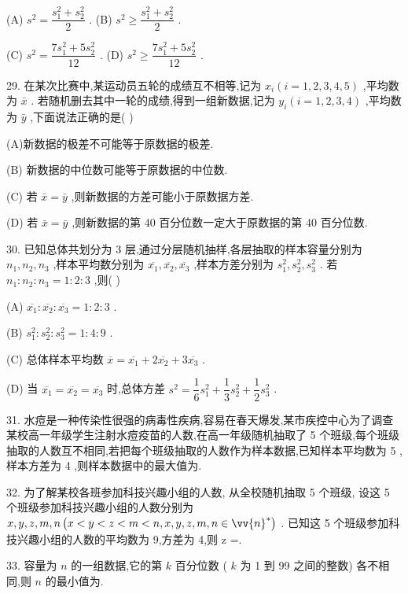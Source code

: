(A) ${s}^{2} = \dfrac{{s}_{1}^{2} + {s}_{2}^{2}}{2}$ . (B) ${s}^{2} \geq  \dfrac{{s}_{1}^{2} + {s}_{2}^{2}}{2}$ .

(C) ${s}^{2} = \dfrac{7{s}_{1}^{2} + 5{s}_{2}^{2}}{12}$ . (D) ${s}^{2} \geq  \dfrac{7{s}_{1}^{2} + 5{s}_{2}^{2}}{12}$ .

29. 在某次比赛中,某运动员五轮的成绩互不相等,记为 ${x}_{i}\left( {i = 1,2,3,4,5}\right)$ ,平均数为 $\bar{x}$ . 若随机删去其中一轮的成绩,得到一组新数据,记为 ${y}_{i}\left( {i = 1,2,3,4}\right)$ ,平均数为 $\bar{y}$ ,下面说法正确的是(   )

(A)新数据的极差不可能等于原数据的极差.

(B) 新数据的中位数可能等于原数据的中位数.

(C) 若 $\bar{x} = \bar{y}$ ,则新数据的方差可能小于原数据方差.

(D) 若 $\bar{x} = \bar{y}$ ,则新数据的第 40 百分位数一定大于原数据的第 40 百分位数.

30. 已知总体共划分为 3 层,通过分层随机抽样,各层抽取的样本容量分别为 ${n}_{1},{n}_{2},{n}_{3}$ ,样本平均数分别为 $\overline{{x}_{1}},\overline{{x}_{2}},\overline{{x}_{3}}$ ,样本方差分别为 ${s}_{1}^{2},{s}_{2}^{2},{s}_{3}^{2}$ . 若 ${n}_{1} : {n}_{2} : {n}_{3} = 1 : 2 : 3$ ,则(   )

(A) $\overline{{x}_{1}} : \overline{{x}_{2}} : \overline{{x}_{3}} = 1 : 2 : 3$ .

(B) ${s}_{1}^{2} : {s}_{2}^{2} : {s}_{3}^{2} = 1 : 4 : 9$ .

(C) 总体样本平均数 $\overline{x} = \overline{{x}_{1}} + 2\overline{{x}_{2}} + 3\overline{{x}_{3}}$ .

(D) 当 $\overline{{x}_{1}} = \overline{{x}_{2}} = \overline{{x}_{3}}$ 时,总体方差 ${s}^{2} = \dfrac{1}{6}{s}_{1}^{2} + \dfrac{1}{3}{s}_{2}^{2} + \dfrac{1}{2}{s}_{3}^{2}$ .

31. 水痘是一种传染性很强的病毒性疾病,容易在春天爆发,某市疾控中心为了调查某校高一年级学生注射水痘疫苗的人数,在高一年级随机抽取了 5 个班级,每个班级抽取的人数互不相同,若把每个班级抽取的人数作为样本数据,已知样本平均数为 5 ,样本方差为 4 ,则样本数据中的最大值为\blkda{}.

32. 为了解某校各班参加科技兴趣小组的人数, 从全校随机抽取 5 个班级, 设这 5 个班级参加科技兴趣小组的人数分别为 $x,y,z,m,n\left( {x < y < z < m < n,x,y,z,m,n \in  {\vv{n}}^{ * }}\right)$ . 已知这 5 个班级参加科技兴趣小组的人数的平均数为 9,方差为 4,则 z =\blkda{}.

33. 容量为 $n$ 的一组数据,它的第 $k$ 百分位数 ( $k$ 为 1 到 99 之间的整数) 各不相同,则 $n$ 的最小值为\blkda{}.

